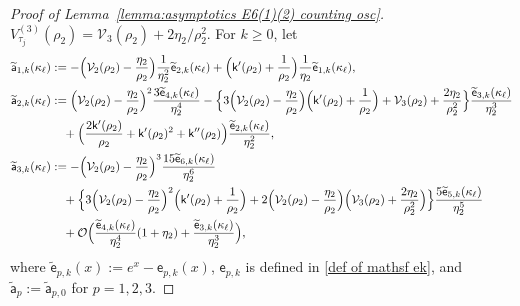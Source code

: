 \documentclass[a4paper]{article}
\numberwithin{equation}{section}
\begin{document}
\begin{proof}[Proof of Lemma~\ref{lemma:asymptotics E6(1)(2) counting osc}]
$V_{\tau_j}^{(3)}(\rho_2)=\mathcal V_3(\rho_2)+2\eta_2/\rho_2^2$.  For $k\ge0$, let
\begin{align*}
\widetilde{\mathsf{a}}_{1,k}(\kappa_{\ell})
&:=-\Bigl(\mathcal{V}_2(\rho_2)-\frac{\eta_2}{\rho_2}\Bigr)\frac{1}{\eta_2^2}\widetilde{\mathsf{e}}_{2,k}(\kappa_{\ell})+\Bigl(\mathsf{k}'(\rho_2)+\frac{1}{\rho_2}\Bigr)\frac{1}{\eta_2}\widetilde{\mathsf{e}}_{1,k}(\kappa_{\ell}),
\\
\widetilde{\mathsf{a}}_{2,k}(\kappa_{\ell})
&:=
\Bigl(\mathcal{V}_2(\rho_2)-\frac{\eta_2}{\rho_2}\Bigr)^2
\frac{3\widetilde{\mathsf{e}}_{4,k}(\kappa_{\ell})}{\eta_2^4}
-
\Bigl\{
3\Bigl(\mathcal{V}_2(\rho_2)-\frac{\eta_2}{\rho_2}\Bigr)
\Bigl(\mathsf{k}'(\rho_2)+\frac{1}{\rho_2}\Bigr)
+\mathcal{V}_3(\rho_2)+\frac{2\eta_2}{\rho_2^2}
\Bigr\}
\frac{\widetilde{\mathsf{e}}_{3,k}(\kappa_{\ell})}{\eta_2^3}
\\
&\quad 
+\Bigl(\frac{2\mathsf{k}'(\rho_2)}{\rho_2}+\mathsf{k}'(\rho_2)^2+\mathsf{k}''(\rho_2)\Bigr)
\frac{\widetilde{\mathsf{e}}_{2,k}(\kappa_{\ell})}{\eta_2^2}, 
\\
\widetilde{\mathsf{a}}_{3,k}(\kappa_{\ell})
&:=
-\Bigl(\mathcal{V}_2(\rho_2)-\frac{\eta_2}{\rho_2}\Bigr)^3
\frac{15\widetilde{\mathsf{e}}_{6,k}(\kappa_{\ell})}{\eta_2^6}
\\
&\quad 
+
\Bigl\{
3\Bigl(\mathcal{V}_2(\rho_2)-\frac{\eta_2}{\rho_2}\Bigr)^2\Bigl(\mathsf{k}'(\rho_2)+\frac{1}{\rho_2}\Bigr)
+
2\Bigl(\mathcal{V}_2(\rho_2)-\frac{\eta_2}{\rho_2}\Bigr)\Bigl(\mathcal{V}_3(\rho_2)+\frac{2\eta_2}{\rho_2^2}\Bigr)
\Bigr\}\frac{5\widetilde{\mathsf{e}}_{5,k}(\kappa_{\ell})}{\eta_2^5}
\\
&\quad 
+
\mathcal{O}\Bigl( 
\frac{\widetilde{\mathsf{e}}_{4,k}(\kappa_{\ell})}{\eta_2^4}(1+\eta_2)
+
\frac{\widetilde{\mathsf{e}}_{3,k}(\kappa_{\ell})}{\eta_2^3}
\Bigr), 
\end{align*} 
where
$\widetilde{\mathsf e}_{p,k}(x):=e^x-\mathsf e_{p,k}(x)$,
$\mathsf e_{p,k}$ is defined in \eqref{def of mathsf ek}, and
$\widetilde{\mathsf a}_{p}:=\widetilde{\mathsf a}_{p,0}$ for $p=1,2,3$.

\end{proof}
\end{document}

